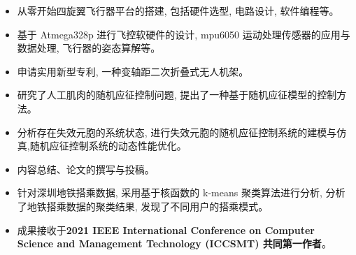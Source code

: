 \begin{itemize}
  \item 从零开始四旋翼飞行器平台的搭建, 包括硬件选型, 电路设计, 软件编程等。
  \item 基于 Atmega328p 进行飞控软硬件的设计, mpu6050 运动处理传感器的应用与数据处理, 飞行器的姿态算解等。
  \item 申请实用新型专利, 一种变轴距二次折叠式无人机架。
\end{itemize}

\begin{itemize}
  \item 研究了人工肌肉的随机应征控制问题, 提出了一种基于随机应征模型的控制方法。
  \item 分析存在失效元胞的系统状态, 进行失效元胞的随机应征控制系统的建模与仿真,随机应征控制系统的动态性能优化。
  \item 内容总结、论文的撰写与投稿。
\end{itemize}

\begin{itemize}
  \item 针对深圳地铁搭乘数据, 采用基于核函数的 k-means 聚类算法进行分析, 分析了地铁搭乘数据的聚类结果, 发现了不同用户的搭乘模式。
  \item 成果接收于\textbf{2021 IEEE International Conference on Computer Science and Management Technology (ICCSMT) 共同第一作者}。
\end{itemize}




